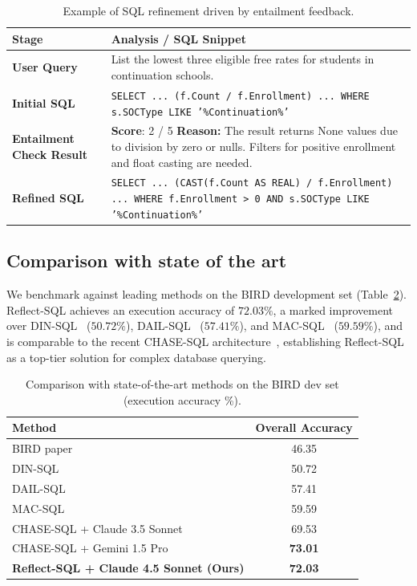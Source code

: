 \begin{table}[ht]
\centering
\small
\begin{tabular}{ >{\bfseries}m{2.2cm} m{9.5cm} }
\toprule
\textbf{Stage} & \textbf{Analysis / SQL Snippet} \\
\midrule
User Query & List the lowest three eligible free rates for students in continuation schools. \\
\addlinespace
Initial SQL & \texttt{SELECT ... (f.Count / f.Enrollment) ... WHERE s.SOCType LIKE '\%Continuation\%'} \\
\addlinespace
Entailment Check Result & \textbf{Score}: 2 / 5 \newline \textbf{Reason:} The result returns None values due to division by zero or nulls. Filters for positive enrollment and float casting are needed. \\
\addlinespace
Refined SQL & \texttt{SELECT ... (CAST(f.Count AS REAL) / f.Enrollment) ... WHERE f.Enrollment > 0 AND s.SOCType LIKE '\%Continuation\%'} \\
\bottomrule
\end{tabular}
\caption{Example of SQL refinement driven by entailment feedback.}
\label{tab:refined-sql}
\end{table}

\subsection{Comparison with state of the art}
We benchmark against leading methods on the BIRD development set (Table~\ref{tab:sota}). Reflect-SQL achieves an execution accuracy of $72.03\%$, a marked improvement over DIN-SQL~\cite{pourreza2023din} ($50.72\%$), DAIL-SQL~\cite{gao2023text} ($57.41\%$), and MAC-SQL~\cite{wang2024mac} ($59.59\%$), and is comparable to the recent CHASE-SQL architecture~\cite{pourreza2024chase}, establishing Reflect-SQL as a top-tier solution for complex database querying.

\begin{table}[ht]
\centering
\begin{tabular}{lc}
\toprule
\textbf{Method} & \textbf{Overall Accuracy} \\
\midrule
BIRD paper~\cite{li2023bird} & 46.35 \\
DIN-SQL~\cite{pourreza2023din} & 50.72 \\
DAIL-SQL~\cite{gao2023text} & 57.41 \\
MAC-SQL~\cite{wang2024mac} & 59.59 \\
CHASE-SQL + Claude 3.5 Sonnet~\cite{pourreza2024chase} & 69.53 \\
CHASE-SQL + Gemini 1.5 Pro~\cite{pourreza2024chase} & \textbf{73.01} \\
\midrule
\textbf{Reflect-SQL + Claude 4.5 Sonnet (Ours)} & \textbf{72.03} \\
\bottomrule
\end{tabular}
\caption{Comparison with state-of-the-art methods on the BIRD dev set (execution accuracy \%).}
\label{tab:sota}
\end{table}

